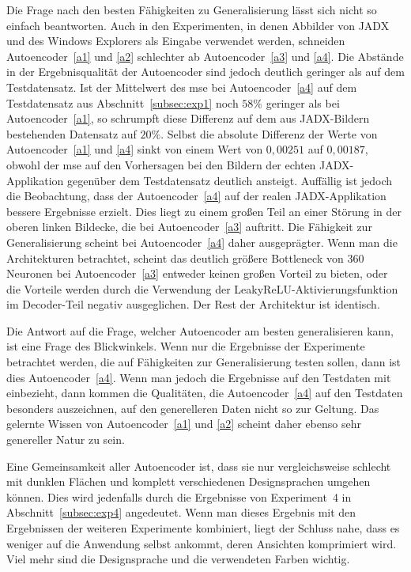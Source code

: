 Die Frage nach den besten Fähigkeiten zu Generalisierung lässt sich nicht so einfach beantworten. Auch in den Experimenten, in denen Abbilder von JADX und des Windows Explorers als Eingabe verwendet werden, schneiden Autoencoder~\ref{a1} und \ref{a2} schlechter ab Autoencoder~\ref{a3} und \ref{a4}. Die Abstände in der Ergebnisqualität der Autoencoder sind jedoch deutlich geringer als auf dem Testdatensatz. Ist der Mittelwert des \gls{mse} bei Autoencoder~\ref{a4} auf dem Testdatensatz aus Abschnitt~\ref{subsec:exp1} noch $58\%$ geringer als bei Autoencoder~\ref{a1}, so schrumpft diese Differenz auf dem aus JADX-Bildern bestehenden Datensatz auf $20\%$. Selbst die absolute Differenz der Werte von Autoencoder~\ref{a1} und \ref{a4} sinkt von einem Wert von $0,00251$ auf $0,00187$, obwohl der \gls{mse} auf den Vorhersagen bei den Bildern der echten JADX-Applikation gegenüber dem Testdatensatz deutlich ansteigt.
Auffällig ist jedoch die Beobachtung, dass der Autoencoder~\ref{a4} auf der realen JADX-Applikation bessere Ergebnisse erzielt. Dies liegt zu einem großen Teil an einer Störung in der oberen linken Bildecke, die bei Autoencoder~\ref{a3} auftritt. Die Fähigkeit zur Generalisierung scheint bei Autoencoder~\ref{a4} daher ausgeprägter. Wenn man die Architekturen betrachtet, scheint das deutlich größere Bottleneck von 360 Neuronen bei Autoencoder~\ref{a3} entweder keinen großen Vorteil zu bieten, oder die Vorteile werden durch die Verwendung der LeakyReLU-Aktivierungsfunktion im Decoder-Teil negativ ausgeglichen. Der Rest der Architektur ist identisch.

Die Antwort auf die Frage, welcher Autoencoder am besten generalisieren kann, ist eine Frage des Blickwinkels. Wenn nur die Ergebnisse der Experimente betrachtet werden, die auf Fähigkeiten zur Generalisierung testen sollen, dann ist dies Autoencoder~\ref{a4}. Wenn man jedoch die Ergebnisse auf den Testdaten mit einbezieht, dann kommen die Qualitäten, die Autoencoder~\ref{a4} auf den Testdaten besonders auszeichnen, auf den generelleren Daten nicht so zur Geltung. Das gelernte Wissen von Autoencoder~\ref{a1} und \ref{a2} scheint daher ebenso sehr genereller Natur zu sein.

Eine Gemeinsamkeit aller Autoencoder ist, dass sie nur vergleichsweise schlecht mit dunklen Flächen und komplett verschiedenen Designsprachen umgehen können. Dies wird jedenfalls durch die Ergebnisse von Experiment~4 in Abschnitt~\ref{subsec:exp4} angedeutet. Wenn man dieses Ergebnis mit den Ergebnissen der weiteren Experimente kombiniert, liegt der Schluss nahe, dass es weniger auf die Anwendung selbst ankommt, deren Ansichten komprimiert wird. Viel mehr sind die Designsprache und die verwendeten Farben wichtig.

